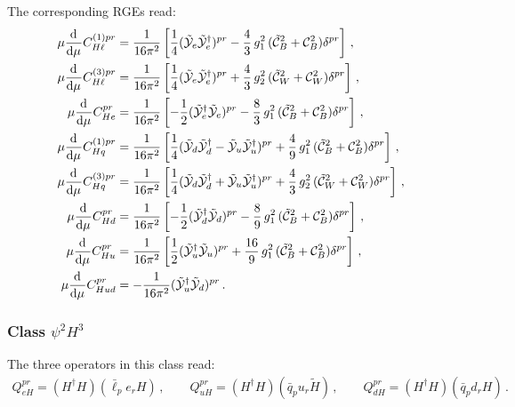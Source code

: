 The corresponding RGEs read:
\begin{align}
\mu \dv[]{}{\mu} {C}_{H\ell}^{(1)pr} &=\frac{1}{16\pi^2}\left[ \frac{1}{4}(\tilde{\mathcal{Y}}_e\tilde{\mathcal{Y}}_e^\dagger)^{pr} - \frac{4}{3} \,g_1^2 \,(\tilde{\mathcal{C}}_{B}^2+ \mathcal{C}_{B}^2)\delta^{pr}\right] \,,  \\
\mu \dv[]{}{\mu} {C}_{H\ell}^{(3)pr} &=\frac{1}{16\pi^2}\left[ \frac{1}{4}(\tilde{\mathcal{Y}}_e\tilde{\mathcal{Y}}_e^\dagger)^{pr} + \frac{4}{3}\, g_2^2\,(\tilde{\mathcal{C}}_{W}^2+ \mathcal{C}_{W}^2)\delta^{pr}\right] \,,  \\
\mu \dv[]{}{\mu} {C}_{He}^{pr} &=\frac{1}{16\pi^2}\left[ -\frac{1}{2}(\tilde{\mathcal{Y}}_e^\dagger \tilde{\mathcal{Y}}_e)^{pr} - \frac{8}{3} \,g_1^2 \,(\tilde{\mathcal{C}}_{B}^2+ \mathcal{C}_{B}^2)\delta^{pr}\right] \,,  \\
\mu \dv[]{}{\mu} {C}_{Hq}^{(1)pr} &=\frac{1}{16\pi^2}\left[ \frac{1}{4}(\tilde{\mathcal{Y}}_d\tilde{\mathcal{Y}}_d^\dagger-\tilde{\mathcal{Y}}_u\tilde{\mathcal{Y}}_u^\dagger)^{pr} + \frac{4}{9} \,g_1^2 \,(\tilde{\mathcal{C}}_{B}^2+ \mathcal{C}_{B}^2) \delta^{pr}\right] \,, \\
\mu \dv[]{}{\mu} {C}_{Hq}^{(3)pr} &=\frac{1}{16\pi^2}\left[ \frac{1}{4}(\tilde{\mathcal{Y}}_d\tilde{\mathcal{Y}}_d^\dagger+\tilde{\mathcal{Y}}_u\tilde{\mathcal{Y}}_u^\dagger)^{pr} + \frac{4}{3}\, g_2^2\,(\tilde{\mathcal{C}}_{W}^2+ \mathcal{C}_{W}^2) \delta^{pr}\right] \,,  \\
\mu \dv[]{}{\mu} {C}_{Hd}^{pr} &=\frac{1}{16\pi^2}\left[ -\frac{1}{2}(\tilde{\mathcal{Y}}_d^\dagger \tilde{\mathcal{Y}}_d)^{pr} - \frac{8}{9} \,g_1^2 \,(\tilde{\mathcal{C}}_{B}^2+ \mathcal{C}_{B}^2)\delta^{pr}\right] \,,  \\
\mu \dv[]{}{\mu} {C}_{Hu}^{pr} &=\frac{1}{16\pi^2}\left[ \frac{1}{2}(\tilde{\mathcal{Y}}_u^\dagger \tilde{\mathcal{Y}}_u)^{pr} + \frac{16}{9} \,g_1^2 \,(\tilde{\mathcal{C}}_{B}^2+ \mathcal{C}_{B}^2)\delta^{pr}\right] \,,  \\
\mu \dv[]{}{\mu} {C}_{Hud}^{pr} &= -\frac{1}{16\pi^2}(\tilde{\mathcal{Y}}_u^\dagger \tilde{\mathcal{Y}}_d)^{pr}\,.
\end{align}
%

\subsubsection{Class $\psi^2 H^3$}

The three operators in this class read:
\begin{align}
Q_{eH}^{pr} = (H^\dagger H)(\bar{\ell}_p e_r H)\,, \qquad Q_{uH}^{pr} = (H^\dagger H)(\bar{q}_p u_r \tilde{H})\,, \qquad
Q_{dH}^{pr} = (H^\dagger H)(\bar{q}_p d_r H)\,.
\end{align}

